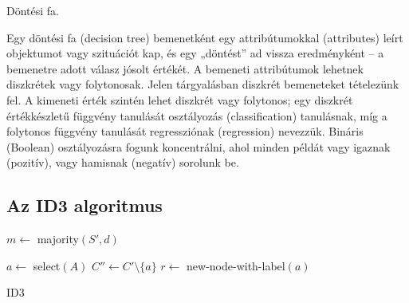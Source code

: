 \begin{definicio}
    Döntési fa.

    Egy döntési fa (decision tree) bemenetként egy attribútumokkal (attributes)
    leírt objektumot vagy szituációt kap, és egy „döntést” ad vissza
    eredményként – a bemenetre adott válasz jósolt értékét. A bemeneti
    attribútumok lehetnek diszkrétek vagy folytonosak. Jelen tárgyalásban
    diszkrét bemeneteket tételezünk fel. A kimeneti érték szintén lehet
    diszkrét vagy folytonos; egy diszkrét értékkészletű függvény tanulását
    osztályozás (classification) tanulásnak, míg a folytonos függvény tanulását
    regressziónak (regression) nevezzük. Bináris (Boolean) osztályozásra fogunk
    koncentrálni, ahol minden példát vagy igaznak (pozitív), vagy hamisnak
    (negatív) sorolunk be.
\end{definicio}

\subsection{Az ID3 algoritmus}

\begin{algorithm}[H]
    \DontPrintSemicolon
    {

        $m \gets$ majority$(S', d)$ \;


        $a \gets$ select$(A)$ \;
        $C'' \gets C'\setminus \{a\} $ \;
        $r \gets $ new-node-with-label$(a)$ \;


        \;
    }
    \caption{ID3}
\end{algorithm}
